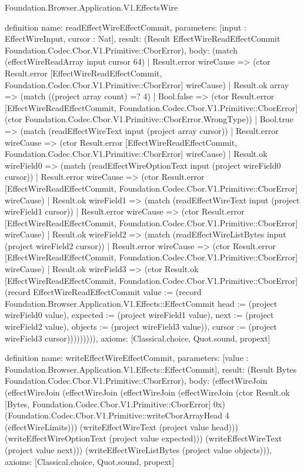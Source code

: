 \begin{lexlean}{Foundation.Browser.Application.V1.EffectsWire}
\begin{semanticmodule}
definition{
  name: readEffectWireEffectCommit,
  parameters: [input : EffectWireInput, cursor : Nat],
  result: (Result EffectWireReadEffectCommit Foundation.Codec.Cbor.V1.Primitive::CborError),
  body: (match (effectWireReadArray input cursor 64)
    | Result.error wireCause => (ctor Result.error [EffectWireReadEffectCommit, Foundation.Codec.Cbor.V1.Primitive::CborError] wireCause)
    | Result.ok array => (match ((project array count) =? 4)
      | Bool.false => (ctor Result.error [EffectWireReadEffectCommit, Foundation.Codec.Cbor.V1.Primitive::CborError] (ctor Foundation.Codec.Cbor.V1.Primitive::CborError.WrongType))
      | Bool.true => (match (readEffectWireText input (project array cursor))
        | Result.error wireCause => (ctor Result.error [EffectWireReadEffectCommit, Foundation.Codec.Cbor.V1.Primitive::CborError] wireCause)
        | Result.ok wireField0 => (match (readEffectWireOptionText input (project wireField0 cursor))
          | Result.error wireCause => (ctor Result.error [EffectWireReadEffectCommit, Foundation.Codec.Cbor.V1.Primitive::CborError] wireCause)
          | Result.ok wireField1 => (match (readEffectWireText input (project wireField1 cursor))
            | Result.error wireCause => (ctor Result.error [EffectWireReadEffectCommit, Foundation.Codec.Cbor.V1.Primitive::CborError] wireCause)
            | Result.ok wireField2 => (match (readEffectWireListBytes input (project wireField2 cursor))
              | Result.error wireCause => (ctor Result.error [EffectWireReadEffectCommit, Foundation.Codec.Cbor.V1.Primitive::CborError] wireCause)
              | Result.ok wireField3 => (ctor Result.ok [EffectWireReadEffectCommit, Foundation.Codec.Cbor.V1.Primitive::CborError] (record EffectWireReadEffectCommit {value := (record Foundation.Browser.Application.V1.Effects::EffectCommit {head := (project wireField0 value), expected := (project wireField1 value), next := (project wireField2 value), objects := (project wireField3 value)}), cursor := (project wireField3 cursor)})))))))),
  axioms: [Classical.choice, Quot.sound, propext]
}

definition{
  name: writeEffectWireEffectCommit,
  parameters: [value : Foundation.Browser.Application.V1.Effects::EffectCommit],
  result: (Result Bytes Foundation.Codec.Cbor.V1.Primitive::CborError),
  body: (effectWireJoin (effectWireJoin (effectWireJoin (effectWireJoin (effectWireJoin (ctor Result.ok [Bytes, Foundation.Codec.Cbor.V1.Primitive::CborError] 0x) (Foundation.Codec.Cbor.V1.Primitive::writeCborArrayHead 4 (effectWireLimits))) (writeEffectWireText (project value head))) (writeEffectWireOptionText (project value expected))) (writeEffectWireText (project value next))) (writeEffectWireListBytes (project value objects))),
  axioms: [Classical.choice, Quot.sound, propext]
}


\end{semanticmodule}
\end{lexlean}
